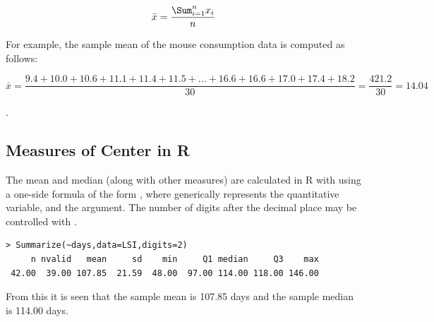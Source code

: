 \documentclass[10pt,openany]{book}\usepackage[]{graphicx}\usepackage[]{color}
\makeatletter
\newenvironment{kframe}{%
 \def\at@end@of@kframe{}%
 \ifinner\ifhmode%
  \def\at@end@of@kframe{\end{minipage}}%
  \begin{minipage}{\columnwidth}%
 \fi\fi%
 \def\FrameCommand##1{\hskip\@totalleftmargin \hskip-\fboxsep
 \colorbox{shadecolor}{##1}\hskip-\fboxsep
     \hskip-\linewidth \hskip-\@totalleftmargin \hskip\columnwidth}%
 \MakeFramed {\advance\hsize-\width
   \@totalleftmargin\z@ \linewidth\hsize
   \@setminipage}}%
 {\par\unskip\endMakeFramed%
 \at@end@of@kframe}
\newenvironment{knitrout}{}{} %
\makeatother
\begin{document}
\begin{equation} \label{eqn:SampleMean}
     \bar{x} = \frac{\Sum_{i=1}^{n}x_{i}}{n}
\end{equation}

For example, the sample mean of the mouse consumption data is computed as follows:

\[ \bar{x} = \frac{9.4+10.0+10.6+11.1+11.4+11.5+ ... +16.6+16.6+17.0+17.4+18.2}{30} = \frac{421.2}{30} = 14.04  \]

.


\subsection{Measures of Center in R} \label{sect:DescStatsCenter}
\vspace{-12pt}
The mean and median (along with other measures) are calculated in R with  using a one-side formula of the form , where  generically represents the quantitative variable, and the  argument.  The number of digits after the decimal place may be controlled with .
\begin{knitrout}
\color{fgcolor}\begin{kframe}
\begin{verbatim}
> Summarize(~days,data=LSI,digits=2)
     n nvalid   mean     sd    min     Q1 median     Q3    max 
 42.00  39.00 107.85  21.59  48.00  97.00 114.00 118.00 146.00 
\end{verbatim}
\end{kframe}
\end{knitrout}

From this it is seen that the sample mean is 107.85 days and the sample median is 114.00 days.
\end{document}
